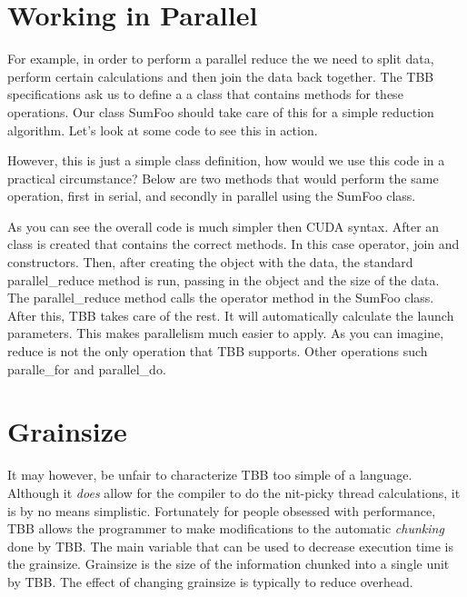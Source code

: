 \documentclass{article}
\newcommand{\comp}[1]{{\ttfamily #1}}
\begin{document}
  \section{Working in Parallel}

  For example, in order to perform a parallel reduce the we need to split data, perform certain calculations and then join the data back together. The TBB specifications ask us to define a a class that contains methods for these operations. Our class \comp{SumFoo} should take care of this for a simple reduction algorithm. Let's look at some code to see this in action. 

  

  However, this is just a simple class definition, how would we use this code in a practical circumstance? Below are two methods that would perform the same operation, first in serial, and secondly in parallel using the \comp{SumFoo} class.

  

  As you can see the overall code is much simpler then CUDA syntax. After an class is created that contains the correct methods. In this case \comp{operator}, \comp{join} and constructors. Then, after creating the object with the data, the standard \comp{parallel\_reduce} method is run, passing in the object and the size of the data. The \comp{parallel\_reduce} method calls the \comp{operator} method in the \comp{SumFoo} class. After this, TBB takes care of the rest. It will automatically calculate the launch parameters. This makes parallelism much easier to apply. As you can imagine, reduce is not the only operation that TBB supports. Other operations such \comp{paralle\_for} and \comp{parallel\_do}. 

  \section{Grainsize}

  It may however, be unfair to characterize TBB too simple of a language. Although it \emph{does} allow for the compiler to do the nit-picky thread calculations, it is by no means simplistic. Fortunately for people obsessed with performance, TBB allows the programmer to make modifications to the automatic \emph{chunking} done by TBB. The main variable that can be used to decrease execution time is the grainsize. Grainsize is the size of the information chunked into a single unit by TBB. The effect of changing grainsize is typically to reduce overhead.
\end{document}
